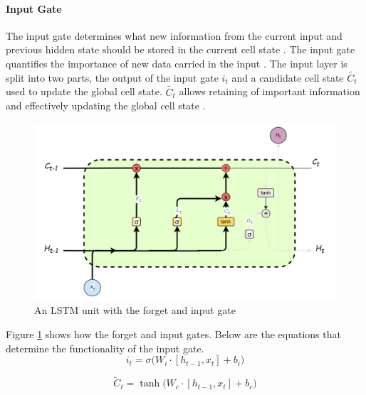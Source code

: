  \paragraph{Input Gate}
 The input gate determines what new information from the current input and previous hidden state should be stored in the current cell state \cite{rafi2021short}. 
 The input gate quantifies the importance of new data carried in the input \cite{stryker_ibm_rnn}. The input layer is split into two parts, the output of the input gate $i_t$ and a candidate cell state $\tilde{C_t}$ used to update the global cell state. $\tilde{C_t}$ allows retaining of important information and effectively updating the global cell state \cite{zhu2025novel}.
\begin{figure}[h]
	\centering
	\includegraphics[width=0.7\linewidth]{Chapters/images/forget_inputgates}
	\caption{An LSTM unit with the forget and input gate }
	\label{fig:forgetinputgates}
\end{figure}

Figure \ref{fig:forgetinputgates} shows how the forget and input gates. Below are the equations that determine the functionality of the input gate. %
\[
i_t = \sigma \Big( W_i \cdot [h_{t-1}, x_t] + b_i \Big)
\tag{25}
\label{eqn:inputgate}
\]

\[
\tilde{C}_t = \tanh \Big( W_c \cdot [h_{t-1}, x_t] + b_c \Big)
\tag{26}
\label{eqn:candidatecell}
\]

